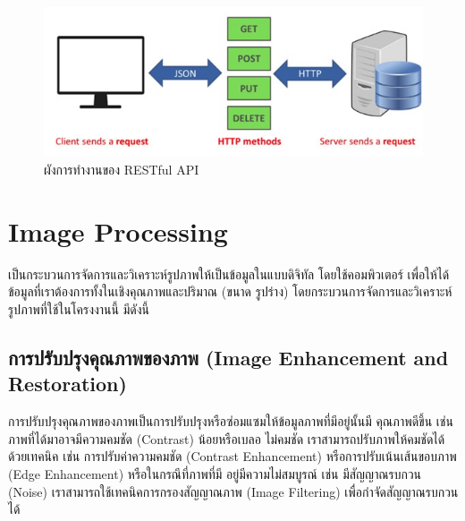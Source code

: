 \begin{figure}[!ht]
  \begin{center}
    \includegraphics[scale=.6]{pic/restapi.jpg}
    \caption[ผังการทำงานของ RESTful API]{ผังการทำงานของ RESTful API}
    \label{fig:restapi}
  \end{center}
\end{figure}

\section{Image Processing }
เป็นกระบวนการจัดการและวิเคราะห์รูปภาพให้เป็นข้อมูลในแบบดิจิทัล โดยใช้คอมพิวเตอร์ 
เพื่อให้ได้ข้อมูลที่เราต้องการทั้งในเชิงคุณภาพและปริมาณ (ขนาด รูปร่าง) \cite{Image} โดยกระบวนการจัดการและวิเคราะห์รูปภาพที่ใช้ในโครงงานนี้ มีดังนี้

\subsection{การปรับปรุงคุณภาพของภาพ   (Image Enhancement and Restoration) }
การปรับปรุงคุณภาพของภาพเป็นการปรับปรุงหรือซ่อมแซมให้ข้อมูลภาพที่มีอยู่นั้นมี คุณภาพดีขึ้น เช่น ภาพที่ได้มาอาจมีความคมชัด (Contrast) น้อยหรือเบลอ ไม่คมชัด 
เราสามารถปรับภาพให้คมชัดได้ด้วยเทคนิค เช่น การปรับค่าความคมชัด (Contrast Enhancement) หรือการปรับเน้นเส้นขอบภาพ (Edge Enhancement) 
หรือในกรณีที่ภาพที่มี อยู่มีความไม่สมบูรณ์ เช่น มีสัญญาณรบกวน (Noise) เราสามารถใช้เทคนิคการกรองสัญญาณภาพ (Image Filtering) เพื่อกำจัดสัญญาณรบกวนได้

